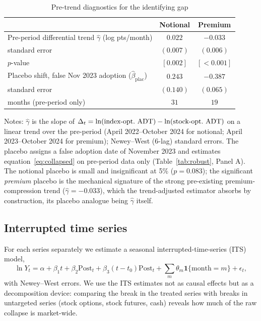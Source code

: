 \documentclass[12pt]{article}
\begin{document}
\begin{table}[H]
\centering
\caption{Pre-trend diagnostics for the identifying gap}
\label{tab:pretrend}
\small
\begin{threeparttable}
\begin{tabular}{lcc}
\toprule
 & Notional & Premium \\
\midrule
Pre-period differential trend $\hat\gamma$ (log pts/month) & $0.022$ & $-0.033$ \\
\quad standard error & $(0.007)$ & $(0.006)$ \\
\quad $p$-value & $[0.002]$ & $[<0.001]$ \\
\addlinespace
Placebo shift, false Nov 2023 adoption ($\hat\beta_{\mathrm{plac}}$) & $0.243$ & $-0.387$ \\
\quad standard error & $(0.140)$ & $(0.065)$ \\
\quad months (pre-period only) & $31$ & $19$ \\
\bottomrule
\end{tabular}
\begin{tablenotes}\footnotesize
\item Notes: $\hat\gamma$ is the slope of $\Delta_t=\ln(\text{index-opt.\
ADT})-\ln(\text{stock-opt.\ ADT})$ on a linear trend over the pre-period
(April 2022--October 2024 for notional; April 2023--October 2024 for
premium); Newey--West (6-lag) standard errors. The placebo assigns a false
adoption date of November 2023 and estimates equation~\eqref{eq:collapsed}
on pre-period data only (Table~\ref{tab:robust}, Panel A). The notional
placebo is small and insignificant at 5\% ($p=0.083$); the significant
\emph{premium} placebo is the mechanical signature of the strong
pre-existing premium-compression trend ($\hat\gamma=-0.033$), which the
trend-adjusted estimator absorbs by construction, its placebo analogue being
$\hat\gamma$ itself.
\end{tablenotes}
\end{threeparttable}
\end{table}

\subsection{Interrupted time series}

For each series separately we estimate a seasonal interrupted-time-series
(ITS) model,
\begin{equation}
\ln Y_t = \alpha + \beta_1 t + \beta_2 \mathrm{Post}_t
+ \beta_3 (t - t_0)\mathrm{Post}_t + \textstyle\sum_{m}\theta_m
\mathbf{1}\{\text{month}=m\} + \epsilon_t,
\label{eq:its}
\end{equation}
with Newey--West errors. We use the ITS estimates not as causal effects but
as a decomposition device: comparing the break in the treated series with
breaks in untargeted series (stock options, stock futures, cash) reveals how
much of the raw collapse is market-wide.
\end{document}
